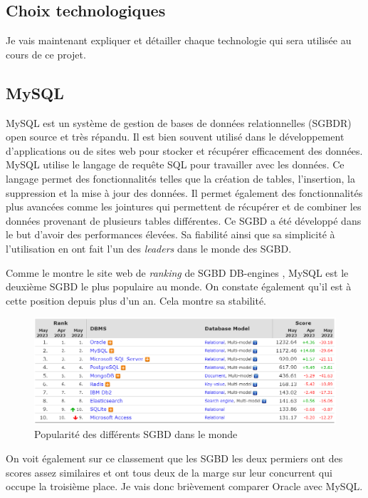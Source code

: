 \subsection{Choix technologiques}
Je vais maintenant expliquer et détailler chaque technologie qui sera utilisée au cours de ce projet.

\subsection{MySQL}
MySQL est un système de gestion de bases de données relationnelles (SGBDR) open source et très répandu. Il est bien souvent utilisé dans le développement d'applications ou de sites web pour stocker et récupérer efficacement des données. MySQL utilise le langage de requête SQL pour travailler avec les données. Ce langage permet des fonctionnalités telles que la création de tables, l'insertion, la suppression et la mise à jour des données. Il permet également des fonctionnalités plus avancées comme les jointures qui permettent de récupérer et de combiner les données provenant de plusieurs tables différentes. Ce SGBD a été développé dans le but d'avoir des performances élevées. Sa fiabilité ainsi que sa simplicité à l'utilisation en ont fait l'un des \emph{leaders} dans le monde des SGBD.

Comme le montre le site web de \emph{ranking} de SGBD DB-engines \cite{DBengines}, MySQL est le deuxième SGBD le plus populaire au monde. On constate également qu'il est à cette position depuis plus d'un an. Cela montre sa stabilité.
\begin{center}
    \begin{figure}[H]
        \includegraphics[width=14cm]{./assets/figures/MySQLPopularity.png}
        \caption{Popularité des différents SGBD dans le monde \label{MySQLPopularity.png}}
    \end{figure}
\end{center}
On voit également sur ce classement que les SGBD les deux permiers ont des scores assez similaires et ont tous deux de la marge sur leur concurrent qui occupe la troisième place. Je vais donc brièvement comparer Oracle avec MySQL.

